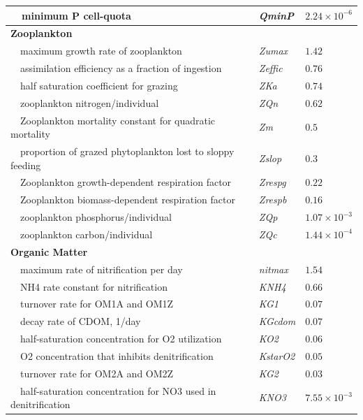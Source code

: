 \documentclass[preprint]{elsarticle}\usepackage[]{graphicx}\usepackage[]{color}
\begin{document}
\begin{table}[!tbp]
{\begin{center}
\begin{tabular}{lll}
~~minimum P cell-quota&\textit{QminP}&$2.24\times 10^{-6}$\tabularnewline
\hline
{\bfseries Zooplankton}&&\tabularnewline
~~maximum growth rate of zooplankton&\textit{Zumax}&$1.42$\tabularnewline
~~assimilation efficiency as a fraction of ingestion&\textit{Zeffic}&$0.76$\tabularnewline
~~half saturation coefficient for grazing&\textit{ZKa}&$0.74$\tabularnewline
~~zooplankton nitrogen/individual&\textit{ZQn}&$0.62$\tabularnewline
~~Zooplankton mortality constant for quadratic mortality&\textit{Zm}&$0.5$\tabularnewline
~~proportion of grazed phytoplankton lost to sloppy feeding&\textit{Zslop}&$0.3$\tabularnewline
~~Zooplankton growth-dependent respiration factor&\textit{Zrespg}&$0.22$\tabularnewline
~~Zooplankton biomass-dependent respiration factor&\textit{Zrespb}&$0.16$\tabularnewline
~~zooplankton phosphorus/individual&\textit{ZQp}&$1.07\times 10^{-3}$\tabularnewline
~~zooplankton carbon/individual&\textit{ZQc}&$1.44\times 10^{-4}$\tabularnewline
\hline
{\bfseries Organic Matter}&&\tabularnewline
~~maximum rate of nitrification per day&\textit{nitmax}&$1.54$\tabularnewline
~~NH4 rate constant for nitrification&\textit{KNH4}&$0.66$\tabularnewline
~~turnover rate for OM1A and OM1Z&\textit{KG1}&$0.07$\tabularnewline
~~decay rate of CDOM, 1/day&\textit{KGcdom}&$0.07$\tabularnewline
~~half-saturation concentration for O2 utilization&\textit{KO2}&$0.06$\tabularnewline
~~O2 concentration that inhibits denitrification&\textit{KstarO2}&$0.05$\tabularnewline
~~turnover rate for OM2A and OM2Z&\textit{KG2}&$0.03$\tabularnewline
~~half-saturation concentration for NO3 used in denitrification&\textit{KNO3}&$7.55\times 10^{-3}$\tabularnewline
\hline
\end{tabular}\end{center}}
\end{table}
\end{document}
